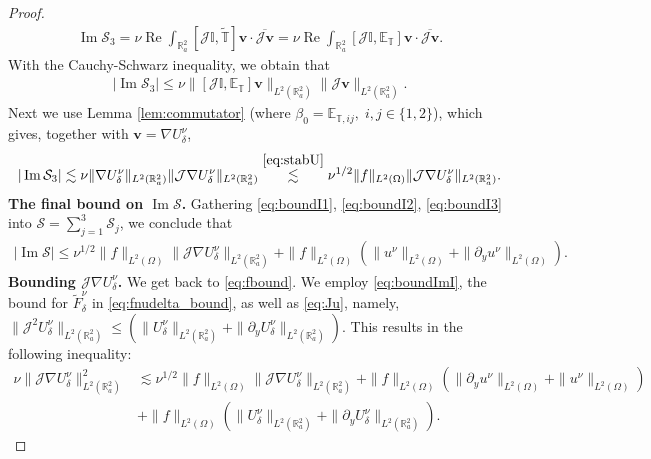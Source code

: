 \documentclass[10pt,a4paper]{amsart}
\renewcommand{\Im}{\operatorname{Im}}
\renewcommand{\Re}{\operatorname{Re}}
\renewcommand{\vec}[1]{\mathbf{#1}}
\begin{document}
\begin{proof}
\begin{align}
	\label{eq:I3}
	\Im\mathcal{S}_3=\nu\Re \int_{\mathbb{R}_a^2}[\mathcal{J}\mathbb{I}, \mathbb{\widetilde{T}}]\vec{v}\cdot\overline{\mathcal{J}\vec{v}}=\nu\Re \int_{\mathbb{R}_a^2}[\mathcal{J}\mathbb{I}, \mathbb{E}_{\mathbb{T}}]\vec{v}\cdot\overline{\mathcal{J}\vec{v}}.
\end{align}
With the Cauchy-Schwarz inequality, we obtain that 
\begin{align*}
	|\Im \mathcal{S}_3|\leq \nu \|[\mathcal{J}\mathbb{I}, \mathbb{E}_{\mathbb{T}}]\vec{v}\|_{L^2(\mathbb{R}^2_a)}\|{\mathcal{J}\vec{v}}\|_{L^2(\mathbb{R}^2_a)}.
\end{align*}
Next we use Lemma \ref{lem:commutator} (where $\beta_0=\mathbb{E}_{\mathbb{T},ij},\; i,j\in\{1,2\}$), which gives, together with $\vec{v}=\nabla U^{\nu}_{\delta}$,  
\begin{align}
	\label{eq:boundI3}
	|\Im \mathcal{S}_3|\lesssim \nu \|\nabla U^{\nu}_{\delta}\|_{L^2(\mathbb{R}^2_a)}\|\mathcal{J}\nabla U^{\nu}_{\delta}\|_{L^2(\mathbb{R}^2_a)}\overset{\eqref{eq:stabU}}{\lesssim} \nu^{1/2}\|f\|_{L^2(\Omega)}\|\mathcal{J}\nabla U^{\nu}_{\delta}\|_{L^2(\mathbb{R}^2_a)}.
\end{align}	
\textbf{The final bound on $\Im \mathcal{S}$. }	Gathering \eqref{eq:boundI1}, \eqref{eq:boundI2}, \eqref{eq:boundI3} into $\mathcal{S}=\sum\limits_{j=1}^3\mathcal{S}_j$, we conclude that 
\begin{align}
	\label{eq:boundImI}
	|\Im \mathcal{S}|\leq \nu^{1/2}\|f\|_{L^2(\Omega)}\|\mathcal{J}\nabla U^{\nu}_{\delta}\|_{L^2(\mathbb{R}^2_a)}+\|f\|_{L^2(\Omega)}(\|u^{\nu}\|_{L^2(\Omega)}+\|\partial_y u^{\nu}\|_{L^2(\Omega)}).
\end{align}
\textbf{Bounding $\mathcal{J}\nabla U^{\nu}_{\delta}$. }We get back to \eqref{eq:fbound}. We employ  \eqref{eq:boundImI}, the bound for $\widetilde{F}^{\nu}_{\delta}$ in \eqref{eq:fnudelta_bound}, as well as \eqref{eq:Ju}, namely, $\|\mathcal{J}^2U^{\nu}_{\delta}\|_{L^2(\mathbb{R}^2_a)}\leq \left(\|U^{\nu}_{\delta}\|_{L^2(\mathbb{R}^2_a)}+\|\partial_y U^{\nu}_{\delta}\|_{L^2(\mathbb{R}^2_a)}\right)$. This results in the following inequality:
\begin{align*}
	\nu\|\mathcal{J}\nabla U^{\nu}_{\delta}\|^2_{L^2(\mathbb{R}^2_a)}&\lesssim \nu^{1/2}\|f\|_{L^2(\Omega)}\|\mathcal{J}\nabla U^{\nu}_{\delta}\|_{L^2(\mathbb{R}^2_a)}+\|f\|_{L^2(\Omega)}\left(\|\partial_y u^{\nu}\|_{L^2(\Omega)}+\|u^{\nu}\|_{L^2(\Omega)}\right)\\
	&+\|f\|_{L^2(\Omega)}(\|U^{\nu}_{\delta}\|_{L^2(\mathbb{R}^2_a)}+\|\partial_y U^{\nu}_{\delta}\|_{L^2(\mathbb{R}^2_a)}).

\end{align*}
\end{proof}
\end{document}
